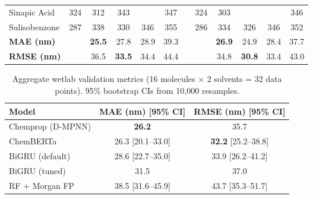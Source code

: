 \documentclass[journal=jcisd8,manuscript=article]{achemso}
\newcommand{\gp}[1]{\cellcolor{goodpred}{#1}}
\begin{document}
\begin{table}[htbp]
\begin{tabular}{lccccccccccc}
Sinapic Acid    & 324 & 312 & 343 & \gp{318} & 347 & & 324 & 303 & \gp{332} & \gp{314} & 346 \\
Sulisobenzone   & 287 & 338 & 330 & 346 & 355 & & 286 & 334 & 326 & 346 & 352 \\
\midrule
\textbf{MAE (nm)} & & \textbf{25.5} & 27.8 & 28.9 & 39.3 & & & \textbf{26.9} & 24.9 & 28.4 & 37.7 \\
\textbf{RMSE (nm)} & & 36.5 & \textbf{33.5} & 34.4 & 44.4 & & & 34.8 & \textbf{30.8} & 33.4 & 43.0 \\
\bottomrule
\end{tabular}
\end{table}

\begin{table}[htbp]
\centering
\caption{Aggregate wetlab validation metrics (16 molecules $\times$ 2 solvents = 32 data points). 95\% bootstrap CIs from 10,000 resamples.}
\label{tab:wetlab_summary}
\begin{tabular}{lcc}
\toprule
\textbf{Model} & \textbf{MAE (nm) [95\% CI]} & \textbf{RMSE (nm) [95\% CI]} \\
\midrule
Chemprop (D-MPNN) & \textbf{26.2}              & 35.7 \\
ChemBERTa         & 26.3 [20.1--33.0] & \textbf{32.2} [25.2--38.8] \\
BiGRU (default)   & 28.6 [22.7--35.0] & 33.9 [26.2--41.2] \\
BiGRU (tuned)     & 31.5 & 37.0 \\
RF + Morgan FP    & 38.5 [31.6--45.9]          & 43.7 [35.3--51.7] \\
\bottomrule
\end{tabular}
\end{table}
\end{document}
